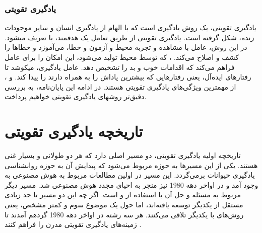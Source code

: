 \subsubsection{یادگیری تقویتی}
یادگیری تقویتی، یک روش یادگیری است که با الهام از یادگیری انسان و سایر موجودات زنده، شکل گرفته است. یادگیری تقویتی از طریق تعامل یک 
\textit{
}
هدفمند،
 با 
\textit{}
تعریف می\nf شود.  در این روش، عامل با مشاهده و تجربه محیط و آزمون و خطا، می‌‌آموزد و خطاها را کشف و اصلاح می‌کند.  
\textit{}
،
که توسط محیط تولید می‌شود، این امکان را برای عامل فراهم می‌کند که اقدامات خوب و بد را تشخیص دهد.  عامل یادگیری، می\nf کوشد تا رفتارهای ایده‌آل، یعنی رفتارهایی که بیشترین پاداش را به همراه دارند را  پیدا کند.  و ، از مهم\nf ترین ویژگی‌های یادگیری تقویتی هستند. در ادامه این پایان‌نامه، به بررسی دقیق‌تر روش\nf های یادگیری تقویتی خواهیم پرداخت.


\section{تاریخچه یادگیری تقویتی}
تاریخچه اولیه یادگیری تقویتی، دو مسیر اصلی دارد که هر دو طولانی و بسیار غنی هستند. یکی از این مسیرها به حوزه  مربوط می‌شود که پیدایش آن به حوزه روانشناسی یادگیری حیوانات برمی‌گردد. این مسیر در اولین مطالعات مربوط به هوش مصنوعی به وجود آمد و در اواخر دهه 1980 نیز منجر به احیای مجدد هوش مصنوعی شد. مسیر دیگر مربوط به مسئله 
\textit{}
و حل آن با استفاده از
\textit{
}
  و
\textit{}
    است. اگر چه این دو مسیر تا حد زیادی مستقل از یکدیگر توسعه یافته‌اند،  اما حول یک موضوع سوم و کمتر مشخص، یعنی روش‌های 
\textit{}
  با یکدیگر تلاقی می‌کنند. هر سه رشته در اواخر دهه 1980 گرد‌هم آمدند تا زمینه‌های یادگیری تقویتی مدرن را فراهم کنند
 \cite{suttonbook}.


